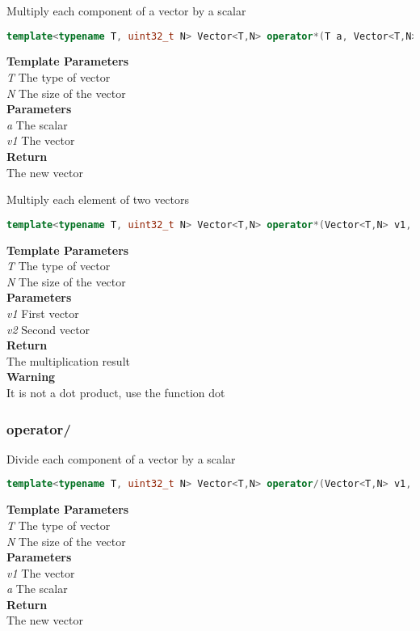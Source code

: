\begin{mdframed}
Multiply each component of a vector by a scalar
\begin{lstlisting}[language=C++]
template<typename T, uint32_t N> Vector<T,N> operator*(T a, Vector<T,N> v1) 
\end{lstlisting}
\textbf{Template Parameters} \\ 
\textit{T} The type of vector \\ 
\textit{N} The size of the vector \\ 
\textbf{Parameters} \\ 
\textit{a} The scalar \\ 
\textit{v1} The vector \\ 
\textbf{Return} \\ 
The new vector\\ 
\end{mdframed}

\begin{mdframed}
Multiply each element of two vectors
\begin{lstlisting}[language=C++]
template<typename T, uint32_t N> Vector<T,N> operator*(Vector<T,N> v1, const Vector<T,N>& v2) 
\end{lstlisting}
\textbf{Template Parameters} \\ 
\textit{T} The type of vector \\ 
\textit{N} The size of the vector \\ 
\textbf{Parameters} \\ 
\textit{v1} First vector \\ 
\textit{v2} Second vector \\ 
\textbf{Return} \\ 
The multiplication result\\ 
\textbf{Warning} \\ 
It is not a dot product, use the function dot\\ 
\end{mdframed}

\subsubsection{operator/}
\begin{mdframed}
Divide each component of a vector by a scalar
\begin{lstlisting}[language=C++]
template<typename T, uint32_t N> Vector<T,N> operator/(Vector<T,N> v1, T a) 
\end{lstlisting}
\textbf{Template Parameters} \\ 
\textit{T} The type of vector \\ 
\textit{N} The size of the vector \\ 
\textbf{Parameters} \\ 
\textit{v1} The vector \\ 
\textit{a} The scalar \\ 
\textbf{Return} \\ 
The new vector\\ 
\end{mdframed}

